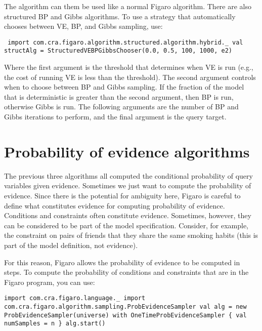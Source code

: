 The algorithm can them be used like a normal Figaro algorithm. There are also structured BP and Gibbs algorithms. To use a strategy that automatically chooses between VE, BP, and Gibbs sampling, use:

\begin{flushleft}
\texttt{
\newline import com.cra.figaro.algorithm.structured.algorithm.hybrid.\_
\newline val structAlg = StructuredVEBPGibbsChooser(0.0, 0.5, 100, 1000, e2)
}
\end{flushleft}

Where the first argument is the threshold that determines when VE is run (e.g., the cost of running VE is less than the threshold). The second argument controls when to choose between BP and Gibbs sampling. If the fraction of the model that is deterministic is greater than the second argument, then BP is run, otherwise Gibbs is run. The following arguments are the number of BP and Gibbs iterations to perform, and the final argument is the query target.

\section{Probability of evidence algorithms}

The previous three algorithms all computed the conditional probability of query variables given evidence. Sometimes we just want to compute the probability of evidence. Since there is the potential for ambiguity here, Figaro is careful to define what constitutes evidence for computing probability of evidence. Conditions and constraints often constitute evidence. Sometimes, however, they can be considered to be part of the model specification. Consider, for example, the constraint on pairs of friends that they share the same smoking habits (this is part of the model definition, not evidence).

For this reason, Figaro allows the probability of evidence to be computed in steps. To compute the probability of conditions and constraints that are in the Figaro program, you can use:

\begin{flushleft}
\texttt{import com.cra.figaro.language.\_
\newline \tab import com.cra.figaro.algorithm.sampling.ProbEvidenceSampler
\newline 
\newline val alg = new ProbEvidenceSampler(universe) with
\newline \tab OneTimeProbEvidenceSampler \{ val numSamples = n \}
\newline alg.start()
}
\end{flushleft}

